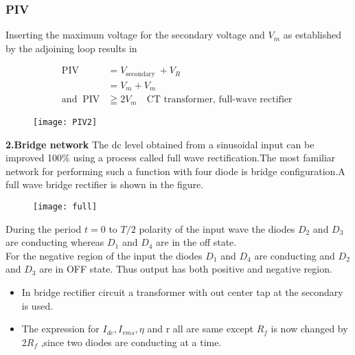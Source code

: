 \subsubsection{PIV}
Inserting the maximum voltage for the secondary voltage and $V_{m}$ as established by the adjoining loop results in\\
\begin{minipage}{0.5\textwidth}
$$
\begin{aligned}
\mathrm{PIV} &=V_{\text {secondary }}+V_{R} \\
&=V_{m}+V_{m}\\
\text{and } \ \mathrm{PIV} &\geqq 2 V_{m} \quad \mathrm{CT} \text{ transformer, full-wave rectifier }
\end{aligned}
$$
\end{minipage}
\begin{minipage}{0.5\textwidth}
\begin{figure}[H]
	\centering
	\texttt{[image: PIV2]}
	\caption{}
	\label{}
\end{figure}
\end{minipage}
\textbf{2.Bridge network}
The dc level obtained from a sinusoidal input can be improved 100$\%$ using a process called full wave rectification.The most familiar network for performing such a function with four diode is bridge configuration.A full wave bridge rectifier is shown in the figure.
\begin{figure}[H]
\centering
\texttt{[image: full]}
\caption{}
\label{}
\end{figure}
During the period $t=0$ to $T/2$ polarity of the input wave the diodes $D_2$ and $D_3$ are conducting whereas $D_1$ and $D_4$ are in the off state.
\\ For the negative region of the input the diodes $D_1$ and $D_4$ are conducting and $D_2$ and $D_3$ are in OFF state.
Thus output has both positive and negative region.
\begin{note}
\begin{itemize}
	\item In bridge rectifier circuit a transformer with out center tap at the secondary is used.\\
	\item The expression for $I_{dc},I_{rms},\eta$ and r all are same except $R_{f}$ is now changed by 2$R_{f}$ ,since two diodes are conducting at a time.
\end{itemize}
\end{note}
